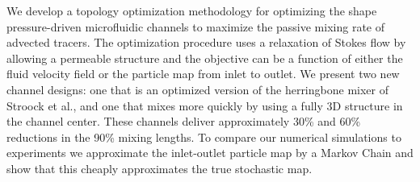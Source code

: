 %
%


We develop a topology optimization methodology for optimizing the
shape pressure-driven microfluidic channels to maximize the passive
mixing rate of advected tracers. The optimization procedure uses a
relaxation of Stokes flow by allowing a permeable structure and the
objective can be a function of either the fluid velocity field or the
particle map from inlet to outlet. We present two new channel designs:
one that is an optimized version of the herringbone mixer of Stroock
et al., and one that mixes more quickly by using a fully 3D structure
in the channel center. These channels deliver approximately 30\% and
60\% reductions in the 90\% mixing lengths. To compare our numerical
simulations to experiments we approximate the inlet-outlet particle
map by a Markov Chain and show that this cheaply approximates the true
stochastic map.




